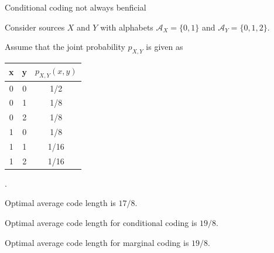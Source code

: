 \begin{frame}{Conditional coding not always benficial}
\bit
\item Consider sources $X$ and $Y$ with alphabets $\mathcal{A}_X=\{0,1\}$ and $\mathcal{A}_Y=\{0,1,2\}$. 
\item Assume that the joint probability $p_{X,Y}$ is given as
\begin{center} 
 \begin{tabular}[hbt!]{ |c|c|c| } 
 \hline
 x & y & $p_{X,Y}(x,y)$ \\
 \hline 
0 & 0 & 1/2\\  
0 & 1 & 1/8\\
0 & 2 &  1/8\\
1 & 0 & 1/8\\
1 & 1 &  1/16\\
1& 2& 1/16\\
 \hline
\end{tabular}.
\end{center}
\eit
{}
\bit
\item Optimal average code length is $17/8$.
\item Optimal average code length for conditional coding is $19/8$.
\item Optimal average code length for marginal coding is $19/8$.
\eit 
\end{frame}



